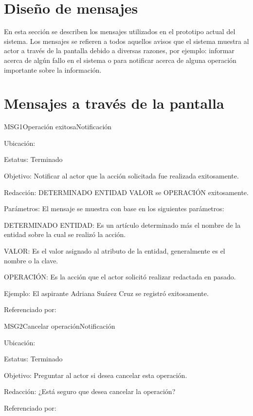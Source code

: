 \newpage
\section{Diseño de mensajes}

	En esta sección se describen los mensajes utilizados en el prototipo actual del sistema. Los mensajes se refieren a todos
	aquellos avisos que el sistema muestra al actor a través de la pantalla debido a diversas
	razones, por ejemplo: informar acerca de algún fallo en el sistema o para notificar acerca de alguna operación importante sobre
	la información.

\section{Mensajes a través de la pantalla}

\begin{mensaje}{MSG1}{Operación exitosa}{Notificación}
	\item[Ubicación:] \msjEmergente
	\item[Estatus:] Terminado
	\item[Objetivo:] Notificar al actor que la acción solicitada fue realizada exitosamente.
	\item[Redacción:] DETERMINADO ENTIDAD VALOR se OPERACIÓN exitosamente.
	\item[Parámetros:] El mensaje se muestra con base en los siguientes parámetros:
	\begin{Citemize} 
		\item DETERMINADO ENTIDAD: Es un artículo determinado más el nombre de la entidad sobre la cual se realizó la acción.
		\item VALOR: Es el valor asignado al atributo de la entidad, generalmente es el nombre o la clave.
		\item OPERACIÓN: Es la acción que el actor solicitó realizar redactada en pasado.
	\end{Citemize}
	\item[Ejemplo:] El aspirante Adriana Suárez Cruz se registró exitosamente.

	\item[Referenciado por:] 
\end{mensaje}

\begin{mensaje}{MSG2}{Cancelar operación}{Notificación}
	\item[Ubicación:] \msjEmergente
	\item[Estatus:] Terminado
	\item[Objetivo:] Preguntar al actor si desea cancelar esta operación.
	\item[Redacción:] ¿Está seguro que desea cancelar la operación?
	\item[Referenciado por:] 
\end{mensaje}

